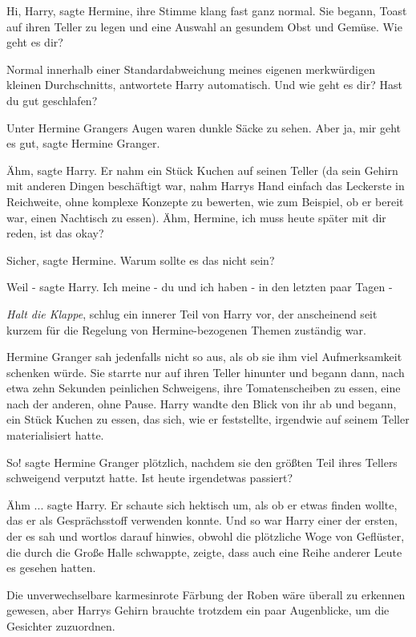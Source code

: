 \glqq{}Hi, Harry\grqq{}, sagte Hermine, ihre Stimme klang fast ganz normal. Sie
begann, Toast auf ihren Teller zu legen und eine Auswahl an gesundem Obst und
Gemüse. \glqq{}Wie geht es dir?\grqq{}

\glqq{}Normal innerhalb einer Standardabweichung meines eigenen merkwürdigen
kleinen Durchschnitts\grqq{}, antwortete Harry automatisch. \glqq{}Und wie geht
es dir? Hast du gut geschlafen?\grqq{}

Unter Hermine Grangers Augen waren dunkle Säcke zu sehen. \glqq{}Aber ja, mir
geht es gut\grqq{}, sagte Hermine Granger.

\glqq{}Ähm\grqq{}, sagte Harry. Er nahm ein Stück Kuchen auf seinen Teller (da
sein Gehirn mit anderen Dingen beschäftigt war, nahm Harrys Hand einfach das
Leckerste in Reichweite, ohne komplexe Konzepte zu bewerten, wie zum Beispiel,
ob er bereit war, einen Nachtisch zu essen). \glqq{}Ähm, Hermine, ich muss heute
später mit dir reden, ist das okay?\grqq{}

\glqq{}Sicher\grqq{}, sagte Hermine. \glqq{}Warum sollte es das nicht sein?\grqq{}

\glqq{}Weil -\grqq{} sagte Harry. \glqq{}Ich meine - du und ich haben - in den
letzten paar Tagen -\grqq{}

\emph{Halt die Klappe}, schlug ein innerer Teil von Harry vor, der anscheinend
seit kurzem für die Regelung von Hermine-bezogenen Themen zuständig war.

Hermine Granger sah jedenfalls nicht so aus, als ob sie ihm viel Aufmerksamkeit
schenken würde. Sie starrte nur auf ihren Teller hinunter und begann dann, nach
etwa zehn Sekunden peinlichen Schweigens, ihre Tomatenscheiben zu essen, eine
nach der anderen, ohne Pause. Harry wandte den Blick von ihr ab und begann, ein
Stück Kuchen zu essen, das sich, wie er feststellte, irgendwie auf seinem Teller
materialisiert hatte.

\glqq{}So!\grqq{} sagte Hermine Granger plötzlich, nachdem sie den größten Teil
ihres Tellers schweigend verputzt hatte. \glqq{}Ist heute irgendetwas
passiert?\grqq{}

\glqq{}Ähm ...\grqq{} sagte Harry. Er schaute sich hektisch um, als ob er etwas
finden wollte, das er als Gesprächsstoff verwenden konnte. Und so war Harry
einer der ersten, der es sah und wortlos darauf hinwies, obwohl die plötzliche
Woge von Geflüster, die durch die Große Halle schwappte, zeigte, dass auch eine
Reihe anderer Leute es gesehen hatten.

Die unverwechselbare karmesinrote Färbung der Roben wäre überall zu erkennen
gewesen, aber Harrys Gehirn brauchte trotzdem ein paar Augenblicke, um die
Gesichter zuzuordnen.

